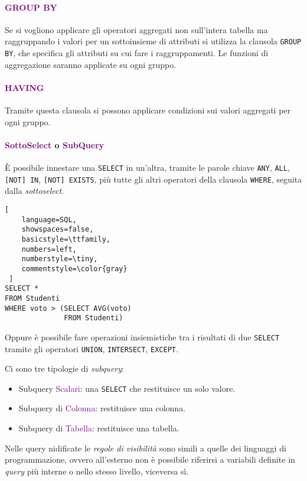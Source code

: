 \paragraph{\textcolor{purple}{GROUP BY}} Se si vogliono applicare gli operatori aggregati non sull'intera
tabella ma raggruppando i valori per un sottoinsieme di attributi si utilizza la clausola \verb|GROUP BY|, che specifica
gli attributi su cui fare i raggruppamenti. Le funzioni di aggregazione saranno applicate su ogni gruppo.

\paragraph{\textcolor{purple}{HAVING}} Tramite questa clausola si possono applicare condizioni sui valori aggregati per ogni gruppo.

\paragraph{\textcolor{purple}{SottoSelect} o \textcolor{purple}{SubQuery}} È possibile innestare una \verb|SELECT| in un'altra, tramite le parole chiave
\verb|ANY|, \verb|ALL|, \verb|[NOT] IN|, \verb|[NOT] EXISTS|, più tutte gli altri operatori della clausola \verb|WHERE|, seguita dalla \emph{sottoselect}.
\begin{lstlisting}[
    language=SQL,
    showspaces=false,
    basicstyle=\ttfamily,
    numbers=left,
    numberstyle=\tiny,
    commentstyle=\color{gray}
 ]
SELECT *
FROM Studenti
WHERE voto > (SELECT AVG(voto)
              FROM Studenti)
\end{lstlisting}

Oppure è possibile fare operazioni insiemistiche tra i risultati di due \verb|SELECT| tramite gli operatori
\verb|UNION|, \verb|INTERSECT|, \verb|EXCEPT|.

Ci sono tre tipologie di \emph{subquery}:
\begin{itemize}
    \item Subquery \textcolor{purple}{Scalari}: una \verb|SELECT| che restituisce un solo valore.
    \item Subquery di \textcolor{purple}{Colonna}: restituisce una colonna.
    \item Subquery di \textcolor{purple}{Tabella}: restituisce una tabella.
\end{itemize}

Nelle query nidificate le \emph{regole di visibilità} sono simili a quelle dei linguaggi
di programmazione, ovvero all'esterno non è possibile riferirsi a variabili definite in \emph{query} più interne o nello stesso livello, viceversa sì.

